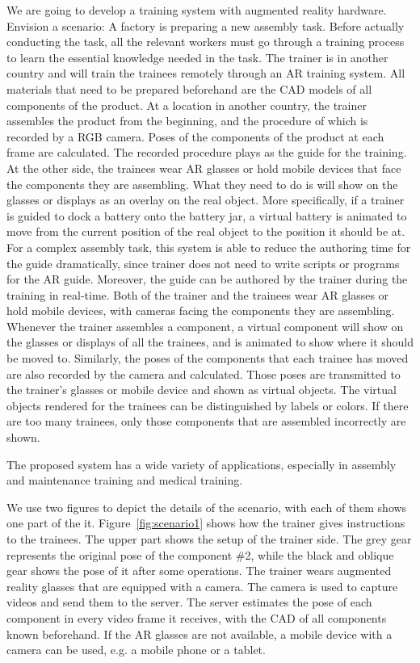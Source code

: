 We are going to develop a training system with augmented reality hardware.
Envision a scenario:
A factory is preparing a new assembly task.
Before actually conducting the task, all the relevant workers must go through a training process to learn the essential knowledge needed in the task.
The trainer is in another country and will train the trainees remotely through an AR training system.
All materials that need to be prepared beforehand are the CAD models of all components of the product.
At a location in another country, the trainer assembles the product from the beginning, and the procedure of which is recorded by a RGB camera. Poses of the components of the product at each frame are calculated. The recorded procedure plays as the guide for the training.
At the other side, the trainees wear AR glasses or hold mobile devices that face the components they are assembling. What they need to do is will show on the glasses or displays as an overlay on the real object. More specifically, if a trainer is guided to dock a battery onto the battery jar, a virtual battery is animated to move from the current position of the real object to the position it should be at.
For a complex assembly task, this system is able to reduce the authoring time for the guide dramatically, since trainer does not need to write scripts or programs for the AR guide.
Moreover, the guide can be authored by the trainer during the training in real-time.
Both of the trainer and the trainees wear AR glasses or hold mobile devices, with cameras facing the components they are assembling.
Whenever the trainer assembles a component, a virtual component will show on the glasses or displays of all the trainees, and is animated to show where it should be moved to.
Similarly, the poses of the components that each trainee has moved are also recorded by the camera and calculated.
Those poses are transmitted to the trainer's glasses or mobile device and shown as virtual objects.
The virtual objects rendered for the trainees can be distinguished by labels or colors. If there are too many trainees, only those components that are assembled incorrectly are shown.

The proposed system has a wide variety of applications, especially in assembly and maintenance training and medical training.

We use two figures to depict the details of the scenario, with each of them shows one part of the it.
Figure~\ref{fig:scenario1} shows how the trainer gives instructions to the trainees.
The upper part shows the setup of the trainer side. The grey gear represents the original pose of the component  \#2, while the black and oblique gear shows the pose of it after some operations.
The trainer wears augmented reality glasses that are equipped with a camera. The camera is used to capture videos and send them to the server.
The server estimates the pose of each component in every video frame it receives, with the CAD of all components known beforehand.
If the AR glasses are not available, a mobile device with a camera can be used, e.g. a mobile phone or a tablet.

